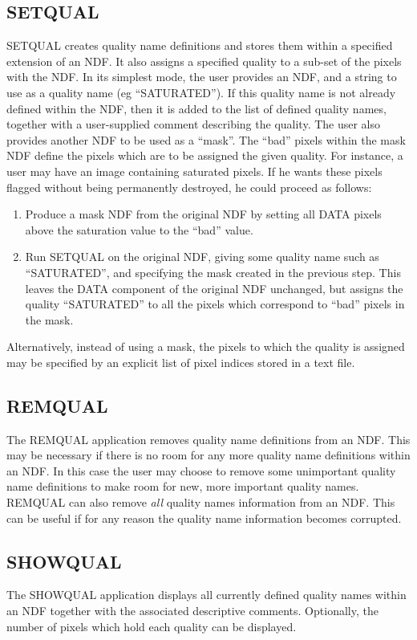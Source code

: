 \subsection{SETQUAL}
SETQUAL creates quality name definitions and stores them within a specified
extension of an NDF. It also assigns a specified quality to a sub-set of the
pixels with the NDF. In its simplest mode, the user provides an NDF, and a
string to use as a quality name (eg ``SATURATED''). If this quality name is not
already defined within the NDF, then it is added to the list of defined quality
names, together with a user-supplied comment describing the quality. The user
also provides another NDF to be used as a ``mask''. The ``bad'' pixels within
the mask NDF define the pixels which are to be assigned the given quality. For
instance, a user may have an image containing saturated pixels. If he wants
these pixels flagged without being permanently destroyed, he could proceed as
follows: 
\begin{enumerate}
\item Produce a mask NDF from the original NDF by setting all DATA pixels 
above the saturation value to the ``bad'' value. 
\item Run SETQUAL on the original NDF, giving some quality name such as
``SATURATED'', and specifying the mask created in the previous step. This leaves
the DATA component of the original NDF unchanged, but assigns the quality
``SATURATED'' to all the pixels which correspond to ``bad'' pixels in the mask. 
\end{enumerate}
Alternatively, instead of using a mask, the pixels to which the quality is
assigned may be specified by an explicit list of pixel indices stored in a
text file.

\subsection{REMQUAL}
The REMQUAL application removes quality name definitions from an NDF. This may be
necessary if there is no room for any more quality name definitions within an
NDF. In this case the user may choose to remove some unimportant quality name
definitions to make room for new, more important quality names. REMQUAL can also
remove {\em all} quality names information from an NDF. This can be useful if
for any reason the quality name information becomes corrupted. 

\subsection{SHOWQUAL}
The SHOWQUAL application displays all currently defined quality names within an
NDF together with the associated descriptive comments. Optionally, the number of
pixels which hold each quality can be displayed. 

